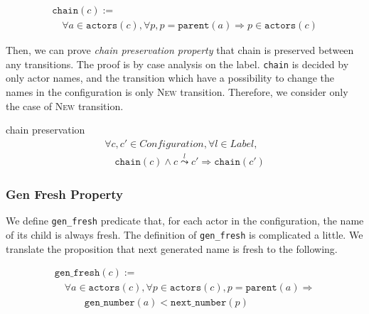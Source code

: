 \begin{displaymath}
  \begin{array}{l}
    \texttt{chain}(c) := \\
    \quad \forall a \in \texttt{actors}(c), \forall p, p = \texttt{parent}(a) \Rightarrow p \in \texttt{actors}(c)
  \end{array}
\end{displaymath}

Then, we can prove \textit{chain preservation property} that chain is preserved between any transitions.
The proof is by case analysis on the label.
\texttt{chain} is decided by only actor names, and the transition which have a possibility to change the names in the configuration is only \textsc{New} transition.
Therefore, we consider only the case of \textsc{New} transition.

\begin{lemma}{chain preservation}
\begin{displaymath}
  \begin{array}{l}
    \forall c, c' \in \textit{Configuration}, \forall l \in \textit{Label}, \\
    \quad \texttt{chain}(c) \wedge c \overset{l}{\leadsto} c' \Rightarrow \texttt{chain}(c')
  \end{array}
\end{displaymath}
\end{lemma}

\subsubsection{Gen Fresh Property}
We define \texttt{gen\_fresh} predicate that, for each actor in the configuration, the name of its child is always fresh.
The definition of \texttt{gen\_fresh} is complicated a little.
We translate the proposition that next generated name is fresh to the following.

\begin{displaymath}
  \begin{array}{l}
    \texttt{gen\_fresh}(c) := \\
    \quad \forall a \in \texttt{actors}(c), \forall p \in \texttt{actors}(c), p = \texttt{parent}(a) \Rightarrow \\
    \quad \quad \quad \texttt{gen\_number}(a) < \texttt{next\_number}(p)
  \end{array}
\end{displaymath}


